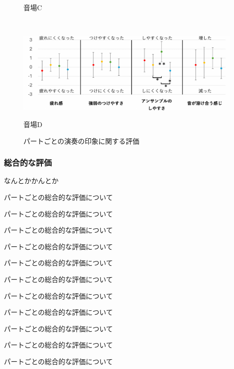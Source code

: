 \documentclass[11pt,a4j]{jreport}
\begin{document}
\begin{figure}[H]
\begin{minipage}{1\linewidth}
      \caption*{音場C}
      \label{fig:演奏の印象C}
    \end{minipage}
    \\
    \vspace{1\baselineskip}
    \begin{minipage}{1\linewidth}
      \centering
      \includegraphics[scale=.55]{images/subjectiveExp/statisticAnalysis/part_performance_d.pdf}
      \caption*{音場D}
      \label{fig:演奏の印象D}
    \end{minipage}
    
    \caption{パートごとの演奏の印象に関する評価}
    \label{fig:パートごとの演奏の印象に関する評価}
  \end{figure}



  \clearpage
  \subsubsection*{総合的な評価}
  なんとかかんとか

  パートごとの総合的な評価について

  パートごとの総合的な評価について

  パートごとの総合的な評価について

  パートごとの総合的な評価について

  パートごとの総合的な評価について

  パートごとの総合的な評価について

  パートごとの総合的な評価について

  パートごとの総合的な評価について

  パートごとの総合的な評価について

  パートごとの総合的な評価について

  パートごとの総合的な評価について
\end{document}
